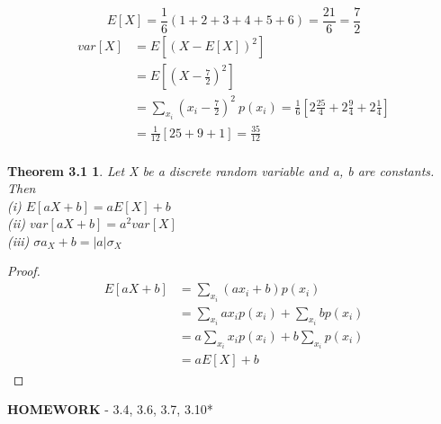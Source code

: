 \documentclass{letter}
\begin{document}
\[ E[X] = \frac{1}{6}(1+2+3+4+5+6) = \frac{21}{6} = \frac{7}{2} \]
\begin{align*}
var[X] & = E[(X-E[X])^2]\\
& =E[(X- \frac{7}{2})^2]\\
& =\sum_{x_i}( x_i- \frac{7}{2} )^2\ p(x_i) = \frac{1}{6} \left[ 2\frac{25}{4}+2\frac{9}{4}+2\frac{1}{4} \right] \\
& =\frac{1}{12}[25+9+1]=\frac{35}{12}\\
\end{align*}
\pagebreak

\theoremstyle{nonum}
\newtheorem{threetwo}{Theorem 3.1}
\begin{threetwo}
Let X be a discrete random variable and a, b are constants. Then\\
(i) $E[aX+b] = aE[X]+b$\\
(ii) $var[aX+b] = a^2 var[X]$\\
(iii) $\sigma a_X+b = |a| \sigma_{X}$\\
\end{threetwo}
\begin{proof}
\begin{align*}
E[aX+b] & = \sum_{x_i}(ax_i+b)p(x_i)\\
& =\sum_{x_i}ax_i p(x_i)+\sum_{x_i}bp(x_i)\\
& =a\sum_{x_i} x_i p(x_i) + b\sum_{x_i} p(x_i)\\
& =aE[X]+b
\end{align*}
\end{proof}
\textbf{HOMEWORK} - 3.4, 3.6, 3.7, 3.10*
\end{document}
